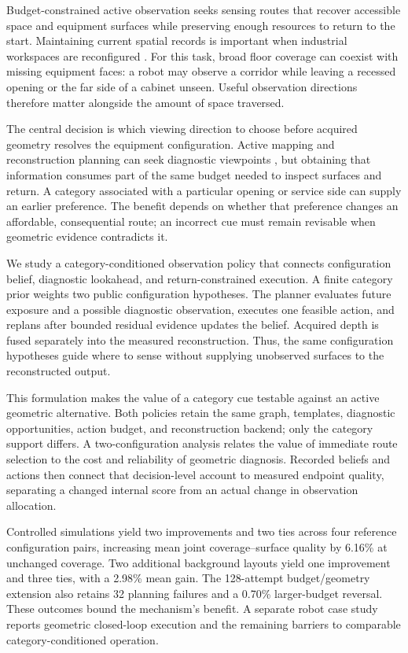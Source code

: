 \documentclass[11pt,a4paper]{article}
\begin{document}
Budget-constrained active observation seeks sensing routes that recover accessible space and equipment surfaces while preserving enough resources to return to the start. Maintaining current spatial records is important when industrial workspaces are reconfigured \cite{ref9}. For this task, broad floor coverage can coexist with missing equipment faces: a robot may observe a corridor while leaving a recessed opening or the far side of a cabinet unseen. Useful observation directions therefore matter alongside the amount of space traversed.

The central decision is which viewing direction to choose before acquired geometry resolves the equipment configuration. Active mapping and reconstruction planning can seek diagnostic viewpoints \cite{ref10}, but obtaining that information consumes part of the same budget needed to inspect surfaces and return. A category associated with a particular opening or service side can supply an earlier preference. The benefit depends on whether that preference changes an affordable, consequential route; an incorrect cue must remain revisable when geometric evidence contradicts it.

We study a category-conditioned observation policy that connects configuration belief, diagnostic lookahead, and return-constrained execution. A finite category prior weights two public configuration hypotheses. The planner evaluates future exposure and a possible diagnostic observation, executes one feasible action, and replans after bounded residual evidence updates the belief. Acquired depth is fused separately into the measured reconstruction. Thus, the same configuration hypotheses guide where to sense without supplying unobserved surfaces to the reconstructed output.

This formulation makes the value of a category cue testable against an active geometric alternative. Both policies retain the same graph, templates, diagnostic opportunities, action budget, and reconstruction backend; only the category support differs. A two-configuration analysis relates the value of immediate route selection to the cost and reliability of geometric diagnosis. Recorded beliefs and actions then connect that decision-level account to measured endpoint quality, separating a changed internal score from an actual change in observation allocation.

Controlled simulations yield two improvements and two ties across four reference configuration pairs, increasing mean joint coverage--surface quality by 6.16\% at unchanged coverage. Two additional background layouts yield one improvement and three ties, with a 2.98\% mean gain. The 128-attempt budget/geometry extension also retains 32 planning failures and a 0.70\% larger-budget reversal. These outcomes bound the mechanism's benefit. A separate robot case study reports geometric closed-loop execution and the remaining barriers to comparable category-conditioned operation.
\end{document}
